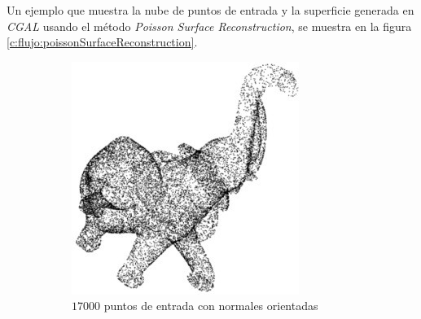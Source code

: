 
Un ejemplo que muestra la nube de puntos de entrada y la superficie generada en \emph{CGAL} usando el método \emph{Poisson Surface Reconstruction}, se muestra en la figura \ref{c:flujo:poissonSurfaceReconstruction}.

\begin{figure}[h]

	\begin{subfigure}[b]{0.45\textwidth}
		\centering
			\includegraphics[width=\textwidth]{images/flujo/refinamiento_1_0.jpg}
			\caption{$17000$ puntos de entrada con normales orientadas}
			\label{f:flujoDeTrabajo:refinamiento_1_0}
	\end{subfigure}
	~
	\begin{subfigure}[b]{0.45\textwidth}

\end{subfigure}
\end{figure}
